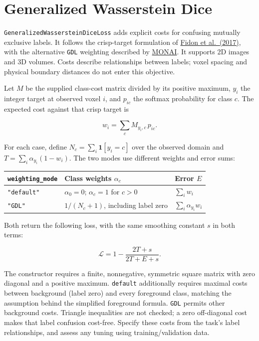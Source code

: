 \section{Generalized Wasserstein Dice}\label{losses:generalized-wasserstein-dice}

\texttt{GeneralizedWassersteinDiceLoss} adds explicit costs for confusing mutually exclusive labels.
It follows the crisp-target formulation of \href{https://arxiv.org/abs/1707.00478}{Fidon et al.~(2017)},
with the alternative \texttt{GDL} weighting described by
\href{https://monai.readthedocs.io/en/stable/losses.html\#generalizedwassersteindiceloss}{MONAI}.
It supports 2D images and 3D volumes. Costs describe relationships between labels; voxel
spacing and physical boundary distances do not enter this objective.

Let \(M\) be the supplied class-cost matrix divided by its positive maximum, \(y_i\) the integer
target at observed voxel \(i\), and \(p_{ic}\) the softmax probability for class \(c\). The expected
cost against that crisp target is

\[
w_i=\sum_c M_{y_i,c}\,p_{ic}.
\]

For each case, define \(N_c=\sum_i\mathbf{1}[y_i=c]\) over the observed domain and
\(T=\sum_i\alpha_{y_i}(1-w_i)\). The two modes use different weights and error sums:

{\small{} %
\begin{longtable}[]{@{}lll@{}}
\toprule\noalign{}
\texttt{weighting\_mode} & Class weights \(\alpha_c\) & Error \(E\) \\
\midrule\noalign{}
\endhead
\bottomrule\noalign{}
\endlastfoot
\texttt{"default"} & \(\alpha_0=0\); \(\alpha_c=1\) for \(c>0\) & \(\sum_i w_i\) \\
\texttt{"GDL"} & \(1/(N_c+1)\), including label zero & \(\sum_i\alpha_{y_i}w_i\) \\
\end{longtable}
}

Both return the following loss, with the same smoothing constant \(s\) in both terms:

\[
\mathcal{L}=1-\frac{2T+s}{2T+E+s}.
\]

The constructor requires a finite, nonnegative, symmetric square matrix with zero diagonal
and a positive maximum. \texttt{default} additionally requires maximal costs between background
(label zero) and every foreground class, matching the assumption behind the simplified
foreground formula. \texttt{GDL} permits other background costs. Triangle inequalities are not
checked; a zero off-diagonal cost makes that label confusion cost-free. Specify these costs
from the task's label relationships, and assess any tuning using training/validation data.

